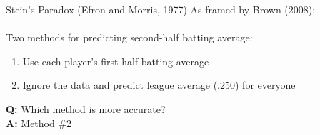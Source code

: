 \documentclass[handout]{beamer}
\begin{document}
  \begin{frame}{Stein's Paradox (Efron and Morris, 1977)}
    As framed by Brown (2008):\\
    ~\\
    Two methods for predicting second-half batting average:
    \begin{enumerate}
      \item Use each player's first-half batting average
      \item Ignore the data and predict league average (.250) for everyone
    \end{enumerate}
    \vspace{1cm}
    {\bf Q:} Which method is more accurate?\\
    \pause
    {\bf A:} Method \#2
  \end{frame}
\end{document}
